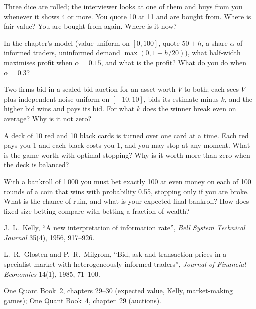 \begin{interviewq}\label{iq:iv:betting-and-market-making-games:10}
Three dice are rolled; the interviewer looks at one of them and buys from you whenever it shows 4 or more. You
quote 10 at 11 and are bought from. Where is fair value? You are bought from again. Where is it now?
\end{interviewq}

\begin{interviewq}\label{iq:iv:betting-and-market-making-games:11}
In the chapter's model (value uniform on $[0, 100]$, quote $50 \pm h$, a share $\alpha$ of informed traders,
uninformed demand $\max(0, 1 - h/20)$), what half-width maximises profit when $\alpha = 0.15$, and what is the
profit? What do you do when $\alpha = 0.3$?
\end{interviewq}

\begin{interviewq}\label{iq:iv:betting-and-market-making-games:12}
Two firms bid in a sealed-bid auction for an asset worth $V$ to both; each sees $V$ plus independent noise uniform
on $[-10, 10]$, bids its estimate minus $k$, and the higher bid wins and pays its bid. For what $k$ does the
winner break even on average? Why is it not zero?
\end{interviewq}

\begin{interviewq}\label{iq:iv:betting-and-market-making-games:13}
A deck of 10 red and 10 black cards is turned over one card at a time. Each red pays you 1 and each black costs you
1, and you may stop at any moment. What is the game worth with optimal stopping? Why is it worth more than zero
when the deck is balanced?
\end{interviewq}

\begin{interviewq}\label{iq:iv:betting-and-market-making-games:14}
With a bankroll of 1\,000 you must bet exactly 100 at even money on each of 100 rounds of a coin that wins with
probability 0.55, stopping only if you are broke. What is the chance of ruin, and what is your expected final
bankroll? How does fixed-size betting compare with betting a fraction of wealth?
\end{interviewq}

\begin{omsources}
\item J.~L.~Kelly, ``A new interpretation of information rate'', \emph{Bell System Technical Journal} 35(4), 1956,
917--926.
\item L.~R.~Glosten and P.~R.~Milgrom, ``Bid, ask and transaction prices in a specialist market with
heterogeneously informed traders'', \emph{Journal of Financial Economics} 14(1), 1985, 71--100.
\item One Quant Book~2, chapters 29--30 (expected value, Kelly, market-making games); One Quant Book~4,
chapter~29 (auctions).
\end{omsources}
